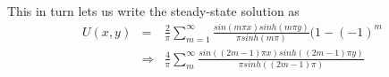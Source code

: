 \documentclass{article}
\begin{document}
This in turn lets us write the steady-state solution as 
\begin{subequations}
\begin{eqnarray}
U(x,y) &=& \frac{2}{\pi} \sum_{m=1}^{\infty} \frac{sin(m\pi x)sinh(m\pi y)}{\pi sinh(m\pi)}(1-(-1)^m \\ 
&\Rightarrow & \frac{4}{\pi} \sum_{m}^{\infty} \frac{sin((2m-1)\pi x)sinh((2m-1)\pi y)}{\pi sinh((2m-1)\pi)}
\end{eqnarray}
\end{subequations}
\end{document}
